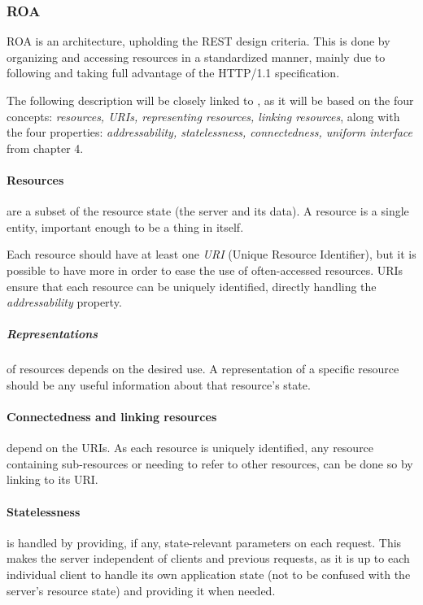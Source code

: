 \subsubsection{ROA}
ROA is an architecture, upholding the REST design criteria.
This is done by organizing and accessing resources in a standardized manner, mainly due to following and taking full advantage of the HTTP/1.1 specification.

The following description will be closely linked to \citet{restful_web_services}, as it will be based on the four concepts: \textit{resources, URIs, representing resources, linking resources}, along with the four properties: \textit{addressability, statelessness, connectedness, uniform interface} from chapter 4.

\paragraph{Resources} are a subset of the resource state (the server and its data).
A resource is a single entity, important enough to be a thing in itself.

Each resource should have at least one \textit{URI} (Unique Resource Identifier), but it is possible to have more in order to ease the use of often-accessed resources.
URIs ensure that each resource can be uniquely identified, directly handling the \textit{addressability} property.

\subparagraph{Representations} of resources depends on the desired use.
A representation of a specific resource should be any useful information about that resource's state.

\paragraph{Connectedness and linking resources} depend on the URIs.
As each resource is uniquely identified, any resource containing sub-resources or needing to refer to other resources, can be done so by linking to its URI. 

\paragraph{Statelessness} is handled by providing, if any, state-relevant parameters on each request.
This makes the server independent of clients and previous requests, as it is up to each individual client to handle its own application state (not to be confused with the server's resource state) and providing it when needed.

